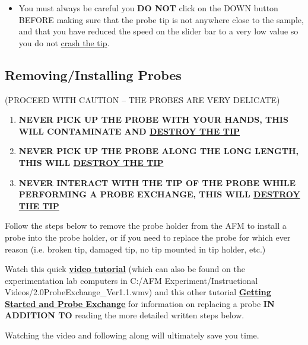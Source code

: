 \documentclass{../lab}
\begin{document}
\begin{itemize}
    \item You must always be careful you \textbf{DO NOT} click on the DOWN button BEFORE making sure that the probe tip is not anywhere close to the sample, and that you have reduced the speed on the slider bar to a very low value so you do not \hyperref[subsec:BrokenTip]{crash the tip}.
\end{itemize}

\subsection{Removing/Installing Probes} (PROCEED WITH CAUTION -- THE PROBES ARE VERY DELICATE)

\begin{enumerate}
    \item \textbf{NEVER PICK UP THE PROBE WITH YOUR HANDS, THIS WILL CONTAMINATE AND \hyperref[subsec:BrokenTip]{DESTROY THE TIP}}

    \item \textbf{NEVER PICK UP THE PROBE ALONG THE LONG LENGTH, THIS WILL \hyperref[subsec:BrokenTip]{DESTROY THE TIP}}

    \item \textbf{NEVER INTERACT WITH THE TIP OF THE PROBE WHILE PERFORMING A PROBE EXCHANGE, THIS WILL \hyperref[subsec:BrokenTip]{DESTROY THE TIP}}
\end{enumerate}

Follow the steps below to remove the probe holder from the AFM to install a probe into the probe holder, or if you need to replace the probe for which ever reason (i.e. broken tip, damaged tip, no tip mounted in tip holder, etc.)

Watch this quick \href{http://experimentationlab.berkeley.edu/sites/default/files/AFMImages/2.0ProbeExchange\_Ver1.1.wmv}{\textbf{video tutorial}} (which can also be found on the experimentation lab computers in C:/AFM Experiment/Instructional Videos/2.0ProbeExchange\_Ver1.1.wmv) and this other tutorial \href{http://experimentationlab.berkeley.edu/sites/default/files/gettingstarted\_final2.mp4}{\textbf{Getting Started and Probe Exchange}} for information on replacing a probe \textbf{IN ADDITION TO} reading the more detailed written steps below.

Watching the video and following along will ultimately save you time.
\end{document}
